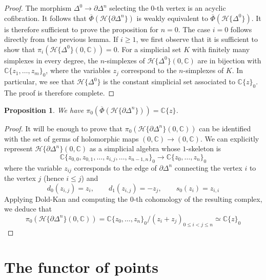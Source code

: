 \documentclass[12pt,a4paper,reqno]{amsart}
\theoremstyle{plain}
\newtheorem{prop}[thm]{Proposition}
\theoremstyle{definition}
\theoremstyle{remark}
\numberwithin{equation}{section}
\begin{document}
\begin{proof}
	The morphism $\Delta^0 \to \partial \Delta^n$ selecting the $0$-th vertex is an acyclic cofibration.
	It follows that $\overline{\Phi}({\mathcal H}\{\partial \Delta^n\})$ is weakly equivalent to $\overline{\Phi}({\mathcal H}\{\Delta^0\})$.
	It is therefore sufficient to prove the proposition for $n = 0$.
	The case $i = 0$ follows directly from the previous lemma.
	If $i \ge 1$, we first observe that it is sufficient to show that $\pi_i({\mathcal H}\{\Delta^0\}(0, \mathbb C)) = 0$.
	For a simplicial set $K$ with finitely many simplexes in every degree, the $n$-simplexes of ${\mathcal H}\{\Delta^0\}(0, \mathbb C)$ are in bijection with $\mathbb C\{z_1, \ldots, z_m\}_0$, where the variables $z_j$ correspond to the $n$-simplexes of $K$.
	In particular, we see that ${\mathcal H}\{\Delta^0\}$ is the constant simplicial set associated to $\mathbb C\{z\}_0$.
	The proof is therefore complete.
\end{proof}

\begin{prop} \label{prop:pi_0_of_the_boundary}
	We have $\pi_0( \overline{\Phi}({\mathcal H}\{\partial \Delta^n\} )) = \mathbb C\{z\}$.
\end{prop}

\begin{proof}
	It will be enough to prove that $\pi_0( {\mathcal H}\{\partial \Delta^n\}(0, \mathbb C))$ can be identified with the set of germs of holomorphic maps $(0, \mathbb C) \to (0, \mathbb C)$.
	We can explicitly represent ${\mathcal H}\{\partial \Delta^n \}(0, \mathbb C)$ as a simplicial algebra whose $1$-skeleton is
	\[ \mathbb C\{z_{0,0}, z_{0,1}, \ldots, z_{i,j}, \ldots, z_{n-1,n} \}_0 \to \mathbb C\{z_0, \ldots, z_n\}_0 \]
	where the variable $z_{ij}$ corresponds to the edge of $\partial \Delta^n$ connecting the vertex $i$ to the vertex $j$ (hence $i \le j$) and
	\[ d_0(z_{i,j}) = z_i, \qquad d_1(z_{i,j}) = - z_j, \qquad s_0(z_i) = z_{i,i} \]
	Applying Dold-Kan and computing the $0$-th cohomology of the resulting complex, we deduce that
	\[ \pi_0( {\mathcal H}\{ \partial \Delta^n \}(0, \mathbb C) ) = \mathbb C\{z_0, \ldots, z_n\}_0 / (z_i + z_j)_{0 \le i < j \le n} \simeq \mathbb C\{z\}_0 \]
\end{proof}

\section{The functor of points} \label{sec:analytic_functor_of_points}
\end{document}
